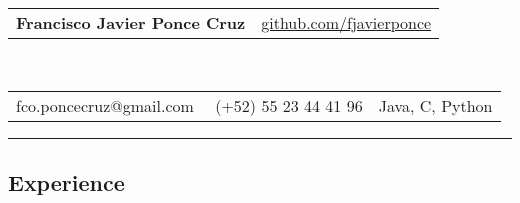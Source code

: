 \documentclass[10pt,letterpaper]{article}
\makeatletter
\newcommand{\headerrow}[2]
{\begin{tabular*}{\linewidth}{l@{\extracolsep{\fill}}r}
	#1 &
	#2 \\
\end{tabular*}}
\newcommand{\CPP}
{C\nolinebreak[4]\hspace{-.05em}\raisebox{.22ex}{\footnotesize\bf ++}}
\makeatother
\begin{document}

\begin{center}
\headerrow
	{\LARGE \textbf{Francisco Javier Ponce Cruz}}
	{\href{https://github.com/fjavierponce}{github.com/fjavierponce}}
\\
\headerrow
	{fco.poncecruz@gmail.com \textbullet \ \ (+52) 55 23 44 41 96}
	{Java,  \CPP, Python}
\end{center}

\hrule
\vspace{-0.4em}
\subsection*{Experience}
\end{document}
